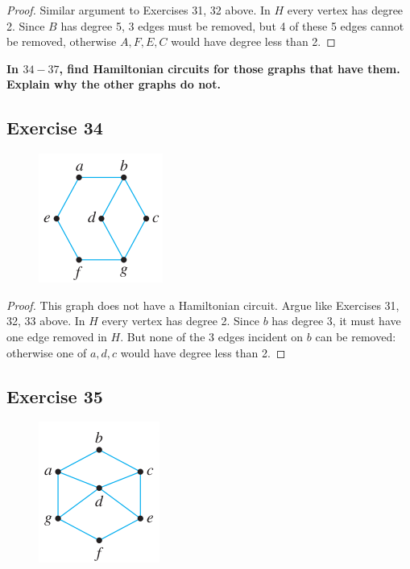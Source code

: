 \documentclass[14pt]{extarticle}
\newcommand{\cy}{\color{cyan}}
\begin{document}
\begin{proof}
Similar argument to Exercises 31, 32 above. In \(H\) every vertex has degree 2. Since \(B\) has degree 5, 3 edges must be 
removed, but 4 of these 5 edges cannot be removed, otherwise \(A,F,E,C\) would have degree less than 2.
\end{proof}

{\bf \cy In $34-37$, find Hamiltonian circuits for those graphs that have them. Explain why the other graphs do not.}

\subsection{Exercise 34}
\begin{figure}[ht!]
\centering
\includegraphics[scale=0.6]{../images/10.1.34.png}
\end{figure}

\begin{proof}
This graph does not have a Hamiltonian circuit. Argue like Exercises 31, 32, 33 above. In \(H\) every vertex has degree 
2. Since \(b\) has degree 3, it must have one edge removed in \(H\). But none of the 3 edges incident on \(b\) can be 
removed: otherwise one of \(a,d,c\) would have degree less than 2.
\end{proof}

\subsection{Exercise 35}
\begin{figure}[ht!]
\centering
\includegraphics[scale=0.6]{../images/10.1.35.png}
\end{figure}
\end{document}

